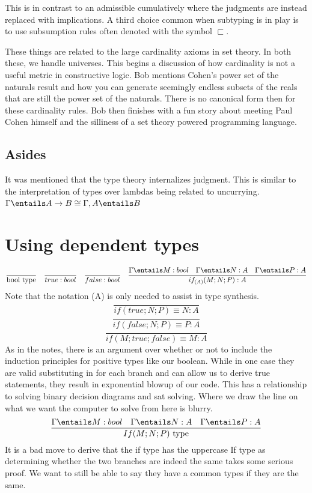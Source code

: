 \documentclass[11pt]{article}
\begin{document}
This is in contrast to an admissible cumulatively where the judgments are instead replaced with implications. A third choice common when subtyping is in play is to use subsumption rules often denoted with the symbol $\sqsubset$.

These things are related to the large cardinality axioms in set theory. In both these, we handle universes. This begins a discussion of how cardinality is not a useful metric in constructive logic. Bob mentions Cohen's power set of the naturals result and how you can generate seemingly endless subsets of the reals that are still the power set of the naturals. There is no canonical form then for these cardinality rules. Bob then finishes with a fun story about meeting Paul Cohen himself and the silliness of a set theory powered programming language.

\subsection*{Asides}
It was mentioned that the type theory internalizes judgment. This is similar to the interpretation of types over lambdas being related to uncurrying. $\Gamma \entails A \rightarrow B \cong \Gamma, A \entails B$
\section*{Using dependent types}
$$\frac{}{\text{bool type}} \quad \frac{}{true : bool} \quad \frac{}{false : bool} \quad \frac{\Gamma \entails M : bool \quad \Gamma \entails N : A \quad \Gamma \entails P : A}{if_{(A)} (M; N; P) : A}$$
Note that the notation (A) is only needed to assist in type synthesis. 
$$\frac{}{if(true; N; P) \equiv N : A}$$
$$\frac{}{if(false; N; P)  \equiv P : A}$$
$$\frac{}{if(M; true; false) \equiv M : A}$$
As in the notes, there is an argument over whether or not to include the induction principles for positive types like our boolean. While in one case they are valid substituting in for each branch and can allow us to derive true statements, they result in exponential blowup of our code. This has a relationship to solving binary decision diagrams and sat solving. Where we draw the line on what we want the computer to solve from here is blurry.
$$\frac{\Gamma \entails M : bool \quad \Gamma \entails N : A \quad \Gamma \entails P : A}{If(M; N; P)\text{ type}}$$
It is a bad move to derive that the if type has the uppercase If type as determining whether the two branches are indeed the same takes some serious proof. We want to still be able to say they have a common types if they are the same.
\end{document}
